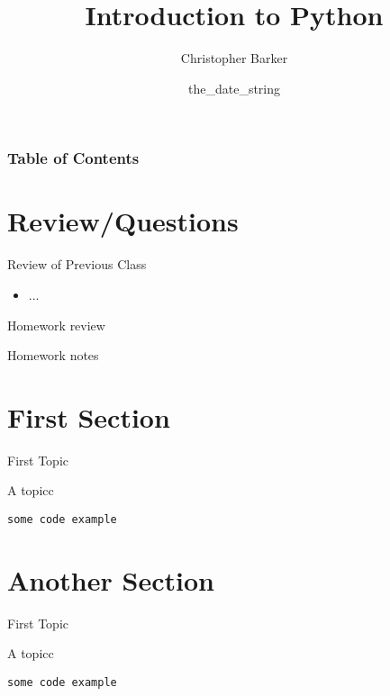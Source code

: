 \documentclass{beamer}
\title[Intro to Python: Week the_week_number]{Introduction  to Python}
\author{Christopher Barker}
\institute{UW Continuing Education / Isilon}
\date{the_date_string}
\begin{document}
\begin{frame}
  \titlepage
\end{frame}

\begin{frame}
\frametitle{Table of Contents}
  \tableofcontents
\end{frame}


\section{Review/Questions}

\begin{frame}{Review of Previous Class}

\begin{itemize}
  \item ...
\end{itemize}

\end{frame}


\begin{frame}{Homework review}

  {\Large Homework notes }

\end{frame}

\section{First Section}

\begin{frame}[fragile]{First Topic}

 {\Large A topicc}

\begin{verbatim}
some code example
\end{verbatim}

\end{frame} 

\section{Another Section}

\begin{frame}[fragile]{First Topic}

 {\Large A topicc}

\begin{verbatim}
some code example
\end{verbatim}

\end{frame} 
\end{document}
